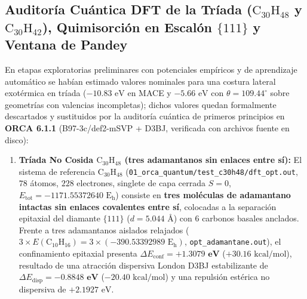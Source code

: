 \documentclass[10pt,twocolumn,a4paper]{article}
\begin{document}
\subsection{Auditoría Cuántica DFT de la Tríada ($\text{C}_{30}\text{H}_{48}$ y $\text{C}_{30}\text{H}_{42}$), Quimisorción en Escalón $\{111\}$ y Ventana de Pandey}
En etapas exploratorias preliminares con potenciales empíricos y de aprendizaje automático se habían estimado valores nominales para una costura lateral exotérmica en tríada ($-10.83\text{ eV}$ en MACE y $-5.66\text{ eV}$ con $\theta = 109.44^\circ$ sobre geometrías con valencias incompletas); dichos valores quedan formalmente descartados y sustituidos por la auditoría cuántica de primeros principios en \textbf{ORCA 6.1.1} (B97-3c/def2-mSVP + D3BJ, verificada con archivos fuente en disco):
\begin{enumerate}
    \item \textbf{Tríada No Cosida $\text{C}_{30}\text{H}_{48}$ (tres adamantanos sin enlaces entre sí):} El sistema de referencia $\text{C}_{30}\text{H}_{48}$ (\texttt{01\_orca\_quantum/test\_c30h48/dft\_opt.out}, $78$ átomos, $228$ electrones, singlete de capa cerrada $S=0$, $E_{\text{tot}} = -1171.55372640\text{ E}_\text{h}$) consiste en \textbf{tres moléculas de adamantano intactas sin enlaces covalentes entre sí}, colocadas a la separación epitaxial del diamante $\{111\}$ ($d = 5.044\text{ \AA}$) con $6$ carbonos basales anclados. Frente a tres adamantanos aislados relajados ($3 \times E(\text{C}_{10}\text{H}_{16}) = 3 \times (-390.53392989\text{ E}_\text{h})$, \texttt{opt\_adamantane.out}), el confinamiento epitaxial presenta $\Delta E_{\text{conf}} = \mathbf{+1.3079\text{ eV}}$ ($+30.16\text{ kcal/mol}$), resultado de una atracción dispersiva London D3BJ estabilizante de $\Delta E_{\text{disp}} = \mathbf{-0.8848\text{ eV}}$ ($-20.40\text{ kcal/mol}$) y una repulsión estérica no dispersiva de $+2.1927\text{ eV}$.

\end{enumerate}
\end{document}
